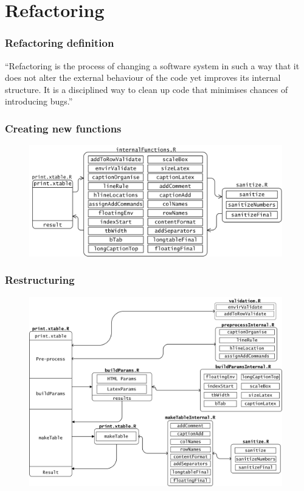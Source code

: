 \documentclass{beamer}
\begin{document}
\section{Refactoring}

\begin{frame}
  \frametitle{Refactoring definition}
  \begin{exampleblock}{}
    {\large ``Refactoring is the process of changing a software system in such a way that it does not alter the external behaviour of the code yet improves its internal structure. It is a disciplined way to clean up code that minimises chances of introducing bugs.''}
    \vskip5mm
    \hspace*{}
  \end{exampleblock}
\end{frame}


\begin{frame}
\frametitle{Creating new functions}
  \vspace{-5mm}
  \begin{figure}
    \includegraphics[width=11cm]{stage1.png}
  \end{figure}
\end{frame}

\begin{frame}
  \frametitle{Restructuring}
  \vspace{-5mm}
  \begin{figure}
    \includegraphics[width=11cm]{refactored.png}
  \end{figure}
\end{frame}
\end{document}
